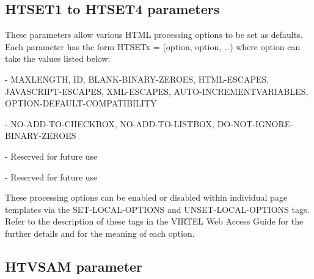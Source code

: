 \documentclass[letterpaper,10pt,english]{sphinxmanual}
\begin{document}

\subsection{HTSET1 to HTSET4 parameters}
\label{\detokenize{Installation_Guide:htset1-to-htset4-parameters}}\label{\detokenize{Installation_Guide:index-79}}
\begin{sphinxVerbatim}[commandchars=\\\{\}]
          
\end{sphinxVerbatim}

These parameters allow various HTML processing options to be set as defaults. Each parameter has the form HTSETx = (option, option, …) where option can take the values listed below:

 - MAXLENGTH, ID, BLANK-BINARY-ZEROES, HTML-ESCAPES, JAVASCRIPT-ESCAPES, XML-ESCAPES, AUTO-INCREMENTVARIABLES, OPTION-DEFAULT-COMPATIBILITY

 - NO-ADD-TO-CHECKBOX, NO-ADD-TO-LISTBOX, DO-NOT-IGNORE-BINARY-ZEROES

 - Reserved for future use

 - Reserved for future use

These processing options can be enabled or disabled within individual page templates via the SET-LOCAL-OPTIONS and UNSET-LOCAL-OPTIONS tags. Refer to the description of these tags in the VIRTEL Web Access Guide for the further details and for the meaning of each option.


\subsection{HTVSAM parameter}
\label{\detokenize{Installation_Guide:index-80}}\label{\detokenize{Installation_Guide:htvsam-parameter}}
\begin{sphinxVerbatim}[commandchars=\\\{\}]
                      
\end{sphinxVerbatim}
\end{document}
